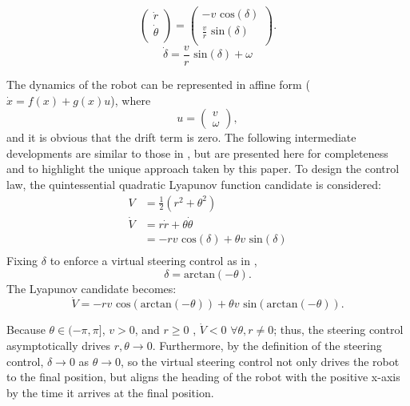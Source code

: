 \documentclass[journal]{IEEEtran}
\begin{document}
\begin{equation}
\left(
\begin{matrix}
\dot{r}\\
\dot{\theta}\\
\end{matrix}
\right)
=
\left(
\begin{matrix}
- v \text{ cos}(\delta)\\
\frac{v}{r} \text{ sin}(\delta)\\
\end{matrix}
\right).
\end{equation}
\begin{equation}
\dot{\delta}=\frac{v}{r} \text{ sin}(\delta)+\omega
\end{equation}

The dynamics of the robot can be represented in affine form ($\dot{x}=f(x)+g(x)u$), where $$u=\left(\begin{matrix}
v\\\omega \end{matrix}\right),$$ and it is obvious that the drift term is zero. The following intermediate developments are similar to those in \cite{park2011}, but are presented here for completeness and to highlight the unique approach taken by this paper. To design the control law, the quintessential quadratic Lyapunov function candidate is considered:
\begin{align*}
V&=\frac{1}{2}(r^2+\theta^2)\\
\dot{V}&=r \dot{r}+\theta \dot{\theta}\\
&=-r v \text{ cos}(\delta) + \theta v \text{ sin}(\delta)\\ 
\end{align*}
Fixing $\delta$ to enforce a virtual steering control as in \cite{park2011}, $$\delta = \text{arctan}(-\theta).$$ The Lyapunov candidate becomes:
\begin{equation}
\dot{V}=-r v \text{ cos}(\text{arctan}(-\theta)) + \theta v \text{ sin}(\text{arctan}(-\theta)).
\end{equation} 

Because $\theta\in (-\pi,\pi]$, $v>0$, and $r\geq 0$ , $\dot{V}<0$ $\forall \theta,r\neq0$; thus, the steering control asymptotically drives $r,\theta\to 0$. Furthermore, by the definition of the steering control, $\delta\to 0$ as $\theta \to 0$, so the virtual steering control not only drives the robot to the final position, but aligns the heading of the robot with the positive x-axis by the time it arrives at the final position. 
\end{document}
